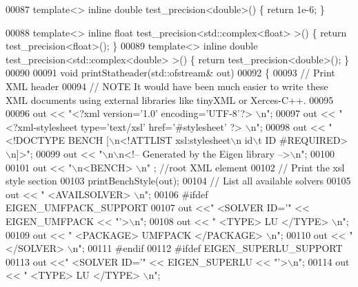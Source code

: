 \begin{DoxyCode}
00087 \textcolor{keyword}{template}<> \textcolor{keyword}{inline} \textcolor{keywordtype}{double} test\_precision<double>() \{ \textcolor{keywordflow}{return} 1e-6; \}                                         
                         
00088 \textcolor{keyword}{template}<> \textcolor{keyword}{inline} \textcolor{keywordtype}{float} test\_precision<std::complex<float> >() \{ \textcolor{keywordflow}{return} test\_precision<float>(); \}
00089 \textcolor{keyword}{template}<> \textcolor{keyword}{inline} \textcolor{keywordtype}{double} test\_precision<std::complex<double> >() \{ \textcolor{keywordflow}{return} test\_precision<double>(); \}
00090 
00091 \textcolor{keywordtype}{void} printStatheader(std::ofstream& out)
00092 \{
00093   \textcolor{comment}{// Print XML header}
00094   \textcolor{comment}{// NOTE It would have been much easier to write these XML documents using external libraries like tinyXML
       or Xerces-C++.}
00095   
00096   out << \textcolor{stringliteral}{"<?xml version='1.0' encoding='UTF-8'?> \(\backslash\)n"};
00097   out << \textcolor{stringliteral}{"<?xml-stylesheet type='text/xsl' href='#stylesheet' ?> \(\backslash\)n"}; 
00098   out << \textcolor{stringliteral}{"<!DOCTYPE BENCH  [\(\backslash\)n<!ATTLIST xsl:stylesheet\(\backslash\)n id\(\backslash\)t ID  #REQUIRED>\(\backslash\)n]>"};
00099   out << \textcolor{stringliteral}{"\(\backslash\)n\(\backslash\)n<!-- Generated by the Eigen library -->\(\backslash\)n"}; 
00100   
00101   out << \textcolor{stringliteral}{"\(\backslash\)n<BENCH> \(\backslash\)n"} ; \textcolor{comment}{//root XML element }
00102   \textcolor{comment}{// Print the xsl style section}
00103   printBenchStyle(out); 
00104   \textcolor{comment}{// List all available solvers }
00105   out << \textcolor{stringliteral}{" <AVAILSOLVER> \(\backslash\)n"};
00106 \textcolor{preprocessor}{#ifdef EIGEN\_UMFPACK\_SUPPORT}
00107   out <<\textcolor{stringliteral}{"  <SOLVER ID='"} << EIGEN\_UMFPACK << \textcolor{stringliteral}{"'>\(\backslash\)n"}; 
00108   out << \textcolor{stringliteral}{"   <TYPE> LU </TYPE> \(\backslash\)n"};
00109   out << \textcolor{stringliteral}{"   <PACKAGE> UMFPACK </PACKAGE> \(\backslash\)n"}; 
00110   out << \textcolor{stringliteral}{"  </SOLVER> \(\backslash\)n"}; 
00111 \textcolor{preprocessor}{#endif}
00112 \textcolor{preprocessor}{#ifdef EIGEN\_SUPERLU\_SUPPORT}
00113   out <<\textcolor{stringliteral}{"  <SOLVER ID='"} << EIGEN\_SUPERLU << \textcolor{stringliteral}{"'>\(\backslash\)n"}; 
00114   out << \textcolor{stringliteral}{"   <TYPE> LU </TYPE> \(\backslash\)n"};

\end{DoxyCode}
